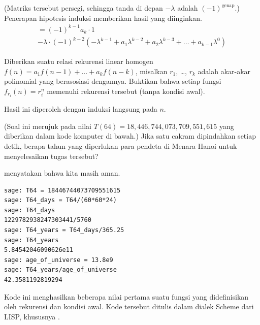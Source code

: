 \begin{exercises}
\begin{answer}
      (Matriks tersebut persegi, sehingga tanda di depan $-\lambda$ adalah
      $(-1)^{\text{genap}}$.)
      Penerapan hipotesis induksi memberikan hasil yang diinginkan.
      \begin{multline*}
        =(-1)^{k-1}a_k\cdot 1                     \\
        -\lambda\cdot
         (-1)^{k-2}(-\lambda^{k-1}+a_1\lambda^{k-2}+a_2\lambda^{k-3}       
               +\dots+a_{k-1}\lambda^0)
      \end{multline*}
    \end{answer}
  \item \label{exer:SoltnsLinRecur}
    Diberikan suatu relasi rekurensi linear homogen
    $f(n)=a_1f(n-1)+\dots+a_kf(n-k)$, misalkan $r_1$, \ldots, $r_k$
    adalah akar-akar polinomial yang berasosiasi dengannya.
    Buktikan bahwa setiap fungsi
         $f_{r_i}(n)=r_i^n$
         memenuhi rekurensi tersebut (tanpa kondisi awal).
    \begin{answer}
       Hasil ini diperoleh dengan induksi langsung pada $n$.
    \end{answer}
  \item 
    (Soal ini merujuk pada nilai $T(64)=18,446,744,073,709,551,615$ yang
    diberikan dalam kode komputer di bawah.)
    Jika satu cakram dipindahkan setiap detik, berapa tahun yang diperlukan
    para pendeta di Menara Hanoi untuk menyelesaikan tugas tersebut?
    \begin{answer}
      \Sage{} menyatakan bahwa kita masih aman.
\begin{lstlisting}
sage: T64 = 18446744073709551615
sage: T64_days = T64/(60*60*24)
sage: T64_days
1229782938247303441/5760
sage: T64_years = T64_days/365.25
sage: T64_years
5.84542046090626e11        
sage: age_of_universe = 13.8e9
sage: T64_years/age_of_universe
42.3581192819294
\end{lstlisting}
    \end{answer}

\end{exercises}

\announcecomputercode
Kode ini menghasilkan beberapa nilai pertama suatu fungsi yang didefinisikan
oleh rekurensi dan kondisi awal.
Kode tersebut ditulis dalam dialek Scheme dari LISP, khususnya
\cite{ChickenScheme}.

